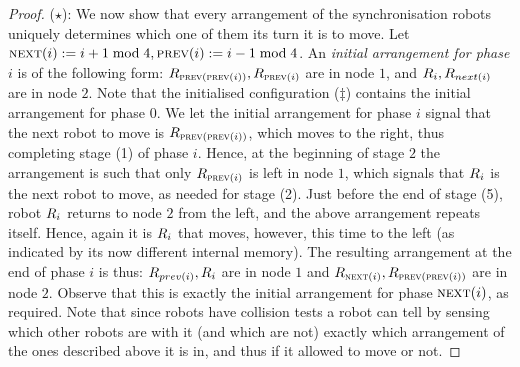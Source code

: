 \begin{proof}
($\star$): We now show that every arrangement of the synchronisation robots uniquely determines which one of them its turn it is to move. Let $\textsc{next}(i) := i+1 \bmod 4, \textsc{prev}(i) := i-1 \bmod 4$. An {\em initial arrangement for phase $i$} is of the following form: $R_{\textsc{prev}(\textsc{prev}(i))}, R_{\textsc{prev}(i)}$ are in node $1$, and $R_i, R_{next(i)}$ are in node $2$. Note that the initialised configuration ($\ddagger$) contains the initial arrangement for phase $0$. We let the initial arrangement for phase $i$ signal that the next robot to move is $R_{\textsc{prev}(\textsc{prev}(i))}$, which moves to the right, thus completing stage (1) of phase $i$. Hence, at the beginning of stage $2$ the arrangement is such that only $R_{\textsc{prev}(i)}$ is left in node $1$, which signals that $R_i$ is the next robot to move, as needed for stage (2). Just before the end of stage (5), robot $R_i$  returns to node $2$ from the left, and the above arrangement repeats itself. Hence, again it is $R_i$ that moves, however, this time to the left (as indicated by its now different internal memory). The resulting arrangement at the end of phase $i$ is thus: $R_{prev(i)}, R_i$ are in node $1$ and $R_{\textsc{next}(i)}, R_{\textsc{prev}(\textsc{prev}(i))}$ are in node $2$. Observe that this is exactly the initial arrangement for phase $\textsc{next}(i)$, as required. Note that since robots have collision tests a robot can tell by sensing which other robots are with it (and which are not) exactly which arrangement of the ones described above it is in, and thus if it allowed to move or not.




\end{proof}
